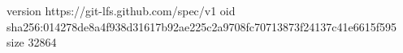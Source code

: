 version https://git-lfs.github.com/spec/v1
oid sha256:014278de8a4f938d31617b92ae225c2a9708fc70713873f24137c41e6615f595
size 32864
